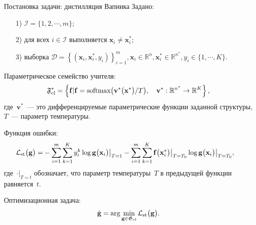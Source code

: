 \documentclass[10pt,pdf,hyperref={unicode}]{beamer}
\begin{document}
\begin{frame}{Постановка задачи: дистилляция Вапника}
\justifying
Задано:
\begin{enumerate}
	\item[1)] $\mathcal{I} = \{1, 2, \cdots, m\}$;
	\item[2)] для всех $i \in \mathcal{I}$ выполняется $\mathbf{x}_i \not= \mathbf{x}^*_i$;
	\item[3)] выборка $\mathcal{D} = \left\{\left(\mathbf{x}_i, \mathbf{x}^*_i, y_i\right)\right\}_{i=1}^{m}, \mathbf{x}_i \in \mathbb{R}^{n}, \mathbf{x}^*_i \in \mathbb{R}^{n^*}, y_i \in \{1, \cdots, K\}$.
\end{enumerate}

\bigskip

Параметрическое семейство учителя:
\[
\setlength\abovedisplayskip{0pt}
\mathfrak{F}_{\text{cl}}^* = \left\{\mathbf{f}| \mathbf{f} = \text{softmax}\bigr(\mathbf{v}^*\bigr(\mathbf{x}^*\bigr)/T\bigr), \quad \mathbf{v}^*: \mathbb{R}^{n^*} \to \mathbb{R}^K \right\},
\setlength\belowdisplayskip{0pt}
\]
где~$\mathbf{v}^*$~--- это дифференцируемые параметрические функции заданной структуры, $T$~--- параметр температуры.

\bigskip

Функция ошибки:
\[
\setlength\abovedisplayskip{0pt}
\begin{aligned}
   \mathcal{L}_\text{st}\bigr(\mathbf{g}\bigr) = &-\sum_{i=1}^{m}{\sum_{k=1}^{K}y^k_i\log\mathbf{g}\bigr(\mathbf{x}_i\bigr)\bigr|_{T=1}}-\sum_{i=1}^{m}{\sum_{k=1}^{K}\mathbf{f}\bigr(\mathbf{x}^*_i\bigr)\bigr|_{T=T_0}\log\mathbf{g}\bigr(\mathbf{x}_i\bigr)\bigr|_{T=T_0}},
\end{aligned}
\setlength\belowdisplayskip{0pt}
\]
где~$\cdot\bigr|_{T=t}$ обозначает, что параметр температуры~$T$ в предыдущей функции равняется~$t$.

\bigskip

Оптимизационная задача:
\[
\setlength\abovedisplayskip{0pt}
	\hat{\mathbf{g}} = \arg\min_{\mathbf{g} \in \mathfrak{G}_{\text{cl}}} \mathcal{L}_\text{st}\bigr(\mathbf{g}\bigr).\setlength\belowdisplayskip{0pt}
\]

\end{frame}
\end{document}
